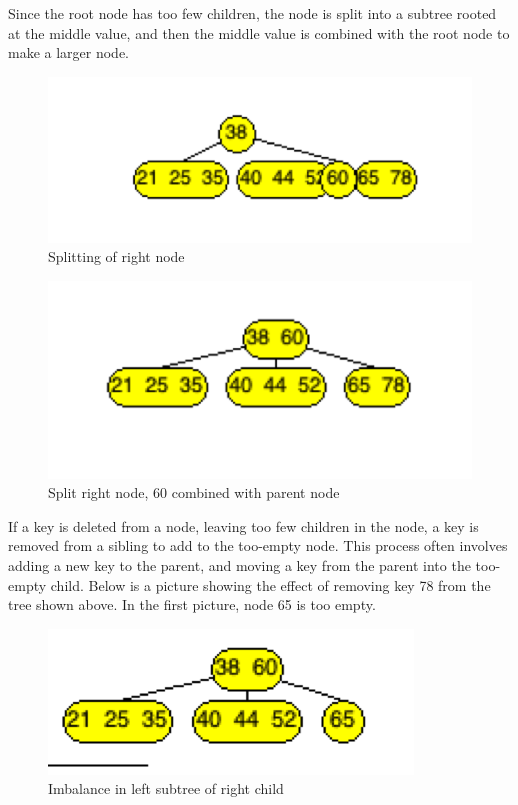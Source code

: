 Since the root node has too few children, the node is split into a subtree rooted at the middle value, and then the middle value is combined with the root node to make a larger node.

\begin{figure}[H]
\centering
\includegraphics{pictures/tree28.png}
\caption{Splitting of right node}
\label{fig:tree28}
\end{figure}

\begin{figure}[H]
\centering
\includegraphics{pictures/tree29.png}
\caption{Split right node, 60 combined with parent node}
\label{fig:tree29}
\end{figure}

If a key is deleted from a node, leaving too few children in the node, a key is removed from a sibling to add to the too-empty node. This process often involves adding a new key to the parent, and moving a key from the parent into the too-empty child. Below is a picture showing the effect of removing key 78 from the tree shown above. In the first picture, node 65 is too empty.

\begin{figure}[H]
\centering
\includegraphics{pictures/tree30.png}
\caption{Imbalance in left subtree of right child}
\label{fig:tree30}
\end{figure}

